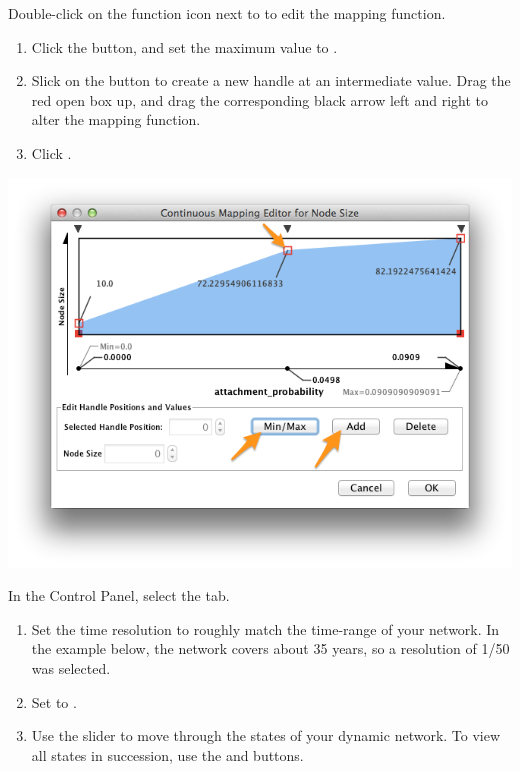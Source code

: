 \documentclass[letterpaper,10pt,english]{sphinxmanual}
\begin{document}
Double-click on the function icon next to  to edit the 
mapping function.
\begin{enumerate}
\item {} 
Click the  button, and set the maximum value to .

\item {} 
Slick on the  button to create a new handle at an intermediate value. Drag
the red open box up, and drag the corresponding black arrow left and right to alter
the mapping function.

\item {} 
Click .

\end{enumerate}

{\hfill\includegraphics{coauthors.36.png}\hfill}

In the Control Panel, select the  tab.
\begin{enumerate}
\item {} 
Set the time resolution to roughly match the time-range of your network. In the
example below, the network covers about 35 years, so a resolution of 1/50 was selected.

\item {} 
Set  to .

\item {} 
Use the slider to move through the states of your dynamic network. To view all states
in succession, use the  and  buttons.

\end{enumerate}
\end{document}
